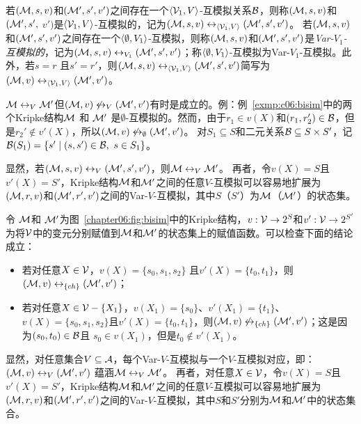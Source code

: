 若$({\cal M},s, v)$和$({\cal M}',s',v')$之间存在一个${\langle{{\cal V}_1, V}\rangle}$-互模拟关系${\cal B}$，则称$({\cal M},s, v)$和$({\cal M}',s',$ $v')$是${\langle{{\cal V}_1, V}\rangle}$-互模拟的，记为$({\cal M},s, v)\leftrightarrow_{\langle{{\cal V}_1, V}\rangle} ({\cal M}',s',v')$。
若$({\cal M},s, v)$和$({\cal M}',s',v')$之间存在一个${\langle{\emptyset, V_1}\rangle}$-互模拟，则称$({\cal M},s, v)$和$({\cal M}',s',v')$是{\em Var-$V_1$-互模拟的}，记为$({\cal M}, s,v) \leftrightarrow_{V_1} ({\cal M}',s',v')$；称${\langle{\emptyset, V_1}\rangle}$-互模拟为Var-$V_1$-互模拟。此外，若$s=r$ 且$s'=r'$，则$({\cal M}, s,v) \leftrightarrow_{{\langle{{\cal V}_1, V}\rangle}} ({\cal M}',s',v')$简写为$({\cal M}, v) \leftrightarrow_{{\langle{{\cal V}_1, V}\rangle}} ({\cal M}',v')$。

${\cal M}\leftrightarrow_V{\cal M}'$但$({\cal M},v)\not\leftrightarrow_V({\cal M}',v')$有时是成立的。例：例~\ref{exmp:c06:bisim}中的两个Kripke结构${\cal M}$ 和 ${\cal M}'$ 是$\emptyset$-互模拟的。然而，由于$r_1\in v(X)$和$(r_1,r_2')\in{\cal B}$，但是$r_2'\not\in v'(X)$，所以$({\cal M},v)\not\leftrightarrow_\emptyset ({\cal M}',v')$。
对$S_1\subseteq S$和二元关系${\cal B}\subseteq S \times S'$，记${\cal B}(S_1) =\{s' \mid (s, s')\in {\cal B},\ s \in S_1\}$。

显然，若$({\cal M},s,v)\leftrightarrow_V({\cal M}',s',v')$，则${\cal M}\leftrightarrow_V{\cal M}'$。
再者，令$v(X)=S$且$v'(X)=S'$，Kripke结构${\cal M}$和${\cal M}'$之间的任意$V$-互模拟可以容易地扩展为$({\cal M},r,v)$和$({\cal M}',r',v')$之间的Var-$V$-互模拟，其中$S$（$S'$）为${\cal M}$（${\cal M}'$）的状态集。

\begin{example}
	令 ${\cal M}$和 ${\cal M}'$为图~\ref{chapter06:fig:bisim}中的Kripke结构，$v: {\cal V} \rightarrow 2^S$和$v': {\cal V} \rightarrow 2^{S'}$为将${\cal V}$中的变元分别赋值到${\cal M}$和${\cal M}'$的状态集上的赋值函数。可以检查下面的结论成立：
	\begin{itemize}
		\item 若对任意$X\in\cal V$，$v(X)= \{s_0, s_1, s_2\}$ 且$v'(X)=\{t_0, t_1\}$，则$({\cal M},v)\leftrightarrow_{\{ch\}} ({\cal M}',v')$；
		
		\item 若对任意$X\in{\cal V}-\{X_1\}$，$v(X_1)= \{s_0\}$、$v'(X_1)=\{t_1\}$、$v(X)= \{s_0, s_1, s_2\}$且$v'(X)=\{t_0, t_1\}$，则$({\cal M},v)\not\leftrightarrow_{\{ch\}} ({\cal M}',v')$；这是因为$(s_0,t_0)\in {\cal B}$且 $s_0\in v(X_1)$，但是$t_0\notin v'(X_1)$。
	\end{itemize}
\end{example}

显然，对任意集合$V\subseteq {\cal A}$，每个Var-$V$-互模拟与一个$V$-互模拟对应，即：$({\cal M},v)\leftrightarrow_V({\cal M}',v')$ 蕴涵${\cal M}\leftrightarrow_V{\cal M}'$。
再者，对任意$X\in {\cal V}$，令$v(X)=S$且$v'(X)=S'$，Kripke结构${\cal M}$和${\cal M}'$之间的任意$V$-互模拟可以容易地扩展为$({\cal M},r,v)$和$({\cal M}',r',v')$之间的Var-$V$-互模拟，其中$S$和$S'$分别为${\cal M}$和${\cal M}'$中的状态集合。

